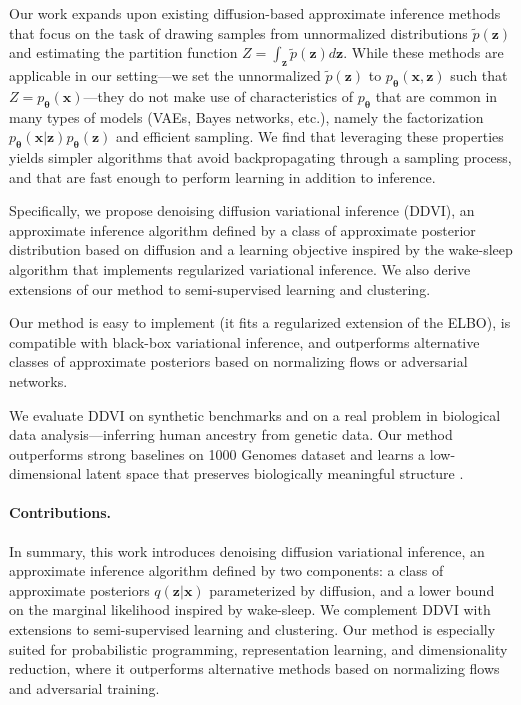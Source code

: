 \documentclass[letterpaper]{article} %
\newcommand{\bx}{\mathbf{x}}
\newcommand{\bz}{\mathbf{z}}
\let\oldtheta\theta
\renewcommand{\theta}{{\boldsymbol \oldtheta}}
\begin{document}
Our work expands upon
existing diffusion-based approximate inference methods \cite{berner2022optimal, zhang2021path, vargas2023denoising, zhang2023diffusion, richter2023improved, sendera2024diffusion, akhound2024iterated} that focus on the task of drawing samples from unnormalized distributions $\tilde p(\bz)$ and estimating the partition function $Z = \int_\bz \tilde p(\bz) d\bz$. 
While these methods are applicable in our setting---we set the unnormalized $\tilde p(\bz)$ to $p_\theta(\bx,\bz)$ such that $Z = p_\theta(\bx)$---they do not make use of characteristics of $p_\theta$ that are common in many types of models (VAEs, Bayes networks, etc.), namely the factorization $p_\theta(\bx|\bz)p_\theta(\bz)$ and efficient sampling.
We find that leveraging these properties yields simpler algorithms that avoid backpropagating through a sampling process, and that are fast enough to perform learning in addition to inference.

Specifically, we propose denoising diffusion variational inference (DDVI), an approximate inference algorithm defined by a class of approximate posterior distribution based on diffusion and a learning objective inspired by the wake-sleep algorithm \citep{hinton1995wake} that implements regularized variational inference.
We also derive extensions of our method to semi-supervised learning and clustering.

Our method is easy to implement (it fits a regularized extension of the ELBO), is compatible with black-box variational inference, and outperforms alternative classes of approximate posteriors based on normalizing flows or adversarial networks.

We evaluate DDVI on synthetic benchmarks and on a real problem in biological data analysis---inferring human ancestry from genetic data. Our method outperforms strong baselines on 1000 Genomes dataset \citep{siva20081000} and learns a low-dimensional latent space that preserves biologically meaningful structure \citep{haghverdi2015diffusion}.

\paragraph{Contributions.} In summary, this work introduces denoising diffusion variational inference, an approximate inference algorithm defined by two components: 
a class of approximate posteriors $q(\bz|\bx)$ parameterized by diffusion,
and a lower bound on the marginal likelihood inspired by wake-sleep.
We complement DDVI with extensions to semi-supervised learning and clustering.
Our method is especially suited for probabilistic programming, representation learning, and dimensionality reduction, where it outperforms alternative methods based on normalizing flows and adversarial training.
\end{document}
